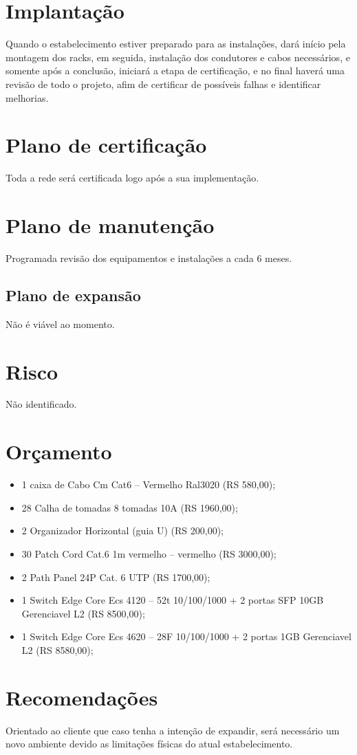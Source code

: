 \documentclass[	DIV=calc,%
							paper=a4,%
							fontsize=12pt,%
							onecolumn]{scrartcl}	 					%
\begin{document}
\section{Implantação}
Quando o estabelecimento estiver preparado para as instalações, dará início pela montagem dos racks, em seguida, instalação dos condutores e cabos necessários, e somente após a conclusão, iniciará a etapa de certificação, e no final haverá uma revisão de todo o projeto, afim de certificar de possíveis falhas e identificar melhorias. 

\section{Plano de certificação}
Toda a rede será certificada logo após a sua implementação.

\section{Plano de manutenção}
Programada revisão dos equipamentos e instalações a cada 6 meses.

\subsection{Plano de expansão}
Não é viável ao momento. 

\section{Risco}
Não identificado.

\section{Orçamento}
\begin{itemize}

	\item 1 caixa de Cabo Cm Cat6 – Vermelho Ral3020 (RS 580,00);
	\item 28 Calha de tomadas 8 tomadas 10A (RS 1960,00);
	\item 2 Organizador Horizontal (guia U) (RS 200,00);
	\item 30 Patch Cord Cat.6 1m vermelho – vermelho (RS 3000,00);
	\item 2 Path Panel 24P Cat. 6 UTP (RS 1700,00);
	\item 1 Switch Edge Core Ecs 4120 – 52t 10/100/1000 + 2 portas SFP 10GB Gerenciavel L2 (RS 8500,00);
	\item 1 Switch Edge Core Ecs 4620 – 28F 10/100/1000 + 2 portas 1GB Gerenciavel L2 (RS 8580,00);
	
\end{itemize}	


\section{Recomendações}
Orientado ao cliente que caso tenha a intenção de expandir, será necessário um novo ambiente devido as limitações físicas do atual estabelecimento.
\end{document}
